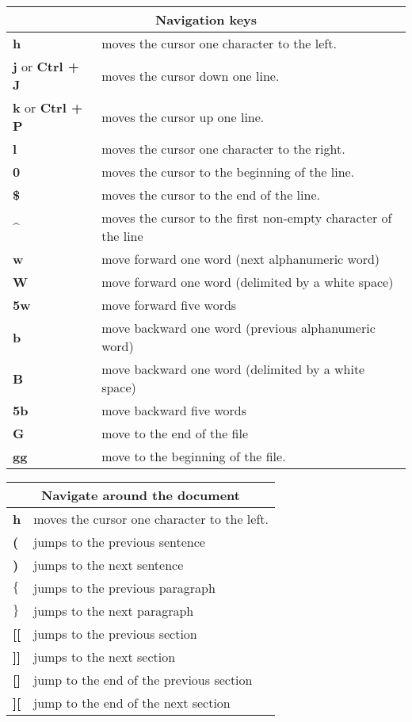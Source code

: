 \begin{table}[h]
\centering
\footnotesize
\begin{tabular}{|l|l|}
\multicolumn{2}{c}{\textbf{Navigation keys}}\\
\hline
\textbf{h}	& {moves the cursor one character to the left.}\\
\hline
{\textbf{j} or\textbf{ Ctrl + J}}	& {moves the cursor down one line.}\\
\hline
{\textbf{k} or \textbf{Ctrl + P}}	& {moves the cursor up one line.}\\
\hline
\textbf{l}  & {moves the cursor one character to the right.}\\
\hline
\textbf{0}	& {moves the cursor to the beginning of the line.}\\
\hline
\textbf{\$}	& {moves the cursor to the end of the line.}\\
\hline
\textbf{\^}	& {moves the cursor to the first non-empty character of the line}\\
\hline
\textbf{w}	& {move forward one word (next alphanumeric word)}\\
\hline
\textbf{W}	& {move forward one word (delimited by a white space)}\\
\hline
\textbf{5w}	& {move forward five words}\\
\hline
\textbf{b}	& {move backward one word (previous alphanumeric word)}\\
\hline
\textbf{B}	& {move backward one word (delimited by a white space)}\\
\hline
\textbf{5b}	& {move backward five words}\\
\hline
\textbf{G}	& {move to the end of the file}\\
\hline
\textbf{gg}	& {move to the beginning of the file.}\\
\hline
\end{tabular}
\end{table}

\begin{table}[h]
\centering
\footnotesize
\begin{tabular}{|l|l|}
\multicolumn{2}{c}{\textbf{Navigate around the document}}\\
\hline
\textbf{h}	& {moves the cursor one character to the left.}\\
\hline
\textbf{(}	& {jumps to the previous sentence}\\
\hline
\textbf{)}	& {jumps to the next sentence}\\
\hline
\textbf{$\lbrace$ }	& {jumps to the previous paragraph}\\
\hline
\textbf{$\rbrace$}	& {jumps to the next paragraph}\\
\hline
\textbf{[[}	& {jumps to the previous section}\\
\hline
\textbf{]]}	& {jumps to the next section}\\
\hline
\textbf{[]}	& {jump to the end of the previous section}\\
\hline
\textbf{][}	& {jump to the end of the next section}\\
\hline
\end{tabular}
\end{table}

